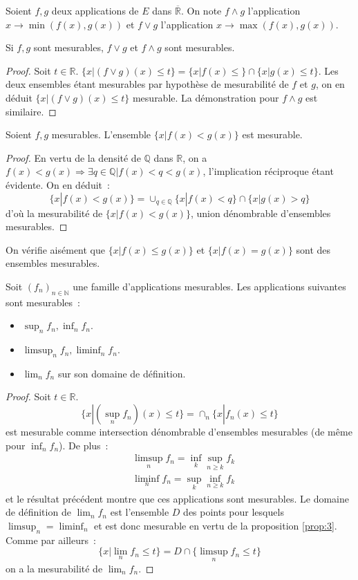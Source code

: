 \begin{defn}
Soient $f,g$ deux applications de $E$ dans $\overline{\mathbb{R}}$. On
note $f \wedge g$ l'application $x \to \min(f(x),
g(x))$ et  $f \vee g$ l'application $x \to \max(f(x), g(x))$.
\end{defn}
\begin{prop}
Si $f,g$ sont mesurables, $f\vee g $ et $f \wedge g$ sont mesurables. 
\end{prop} 
\begin{proof}
Soit $t \in \mathbb{R}$. $\{ x | (f \vee g) (x) \leq t \} = \{ x |
f(x) \leq \} \cap \{ x | g(x) \leq t \}$. Les deux ensembles étant
mesurables par hypothèse de mesurabilité de $f$ et $g$, on en déduit
$\{ x | (f\vee g) (x) \leq t \}$ mesurable. La démonstration pour $f
\wedge g$ est similaire.
\end{proof}
\begin{mandatory}
\begin{prop}\label{prop:3}
Soient $f,g$ mesurables. L'ensemble $\{ x | f(x) < g(x) \}$ est mesurable.
\end{prop}
\end{mandatory}
\begin{proof}
En vertu de la densité de $\mathbb{Q}$ dans $\mathbb{R}$, on a $f(x) <
g(x) \Rightarrow \exists q \in \mathbb{Q} | f(x) < q < g(x)$,
l'implication réciproque étant évidente. On en déduit~:
\[
\{ x | f(x) < g(x) \} = \cup_{q \in \mathbb{Q}} \{ x | f(x) < q  \}
\cap \{x | g(x) > q \}
\]
d'où la mesurabilité de $\{ x | f(x) < g(x) \}$, union dénombrable
d'ensembles mesurables.
\end{proof}
On vérifie aisément que $\{ x | f(x) \leq  g(x) \}$ et $\{ x | f(x)
=  g(x) \}$ sont des ensembles mesurables.
\begin{mandatory}
\begin{prop}
Soit $(f_n)_{n  \in \mathbb{N}}$ une famille d'applications mesurables. Les
applications suivantes sont mesurables~:
\begin{itemize}
\item $\sup_n f_n, \inf_n f_n$.
\item $\limsup_n f_n, \liminf_n f_n$.
\item $\lim_n f_n$ sur son domaine de définition.
\end{itemize}
\end{prop}
\end{mandatory}
\begin{proof}
Soit $t \in \mathbb{R}$.
\[
\{ x | (\sup_n f_n)(x) \leq t \} = \cap_n \{ x | f_n(x) \leq t \}
\]
est mesurable comme intersection dénombrable d'ensembles mesurables
(de même pour $\inf_n f_n$). De plus~:
\begin{align*}
& \limsup_n f_n = \inf_k \sup_{n
\geq k} f_k \\
&\liminf_n f_n = \sup_k \inf_{n \geq k} f_k
\end{align*}
 et le résultat
précédent montre que ces applications sont mesurables. Le domaine de
définition de $\lim_n f_n$ est l'ensemble $D$ des points pour lesquels
$\limsup_n  = \liminf_n$ et est donc mesurable en vertu de la
proposition \ref{prop:3}. Comme par ailleurs~:
\[
\{ x | \lim_n f_n \leq t \}  =  D \cap \{ \limsup_n f_n \leq t \}
\]
on a la mesurabilité de $\lim_n f_n$.
\end{proof}
